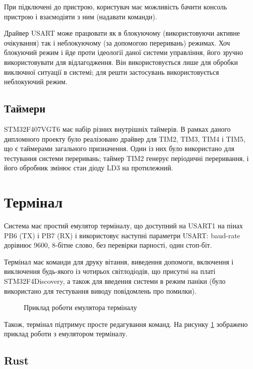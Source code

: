 \documentclass[main.tex]{subfiles}
\begin{document}
  При підключені до пристрою, користувач має можливість бачити консоль пристрою і взаємодіяти з ним (надавати команди).

  Драйвер USART може працювати як в блокуючому (використовуючи активне очікування) так і неблокуючому (за допомогою переривань) режимах. Хоч блокуючий режим і йде проти ідеології даної системи управління, його зручно використовувати для відлагодження. Він використовується лише для обробки виключної ситуації в системі; для решти застосувань використовується неблокуючий режим.

\subsection{Таймери}

STM32F407VGT6 має набір різних внутрішніх таймерів. В рамках даного дипломного проекту було реалізовано драйвер для TIM2, TIM3, TIM4 і TIM5, що є таймерами загального призначення. Один із них було використано для тестування системи переривань; таймер TIM2 генерує періодичні переривання, і його обробник змінює стан діоду LD3 на протилежний.

\section{Термінал}

Система має простий емулятор терміналу, що доступний на USART1 на пінах PB6 (TX) і PB7 (RX) і використовує наступні параметри USART: baud-rate дорівнює 9600, 8-бітне слово, без перевірки парності, один стоп-біт.

Термінал має команди для друку вітання, виведення допомоги, включення і виключення будь-якого із чотирьох світлодіодів, що присутні на платі STM32F4Discovery, а також для введення системи в режим паніки (було використано для тестування виводу повідомлень про помилки).

\begin{figure}[!p]
  \caption{Приклад роботи емулятора терміналу}\label{fig:terminal}
\end{figure}

Також, термінал підтримує просте редагування команд. На рисунку \ref{fig:terminal} зображено приклад роботи з емулятором терміналу.

\subsection{Rust}
\end{document}
